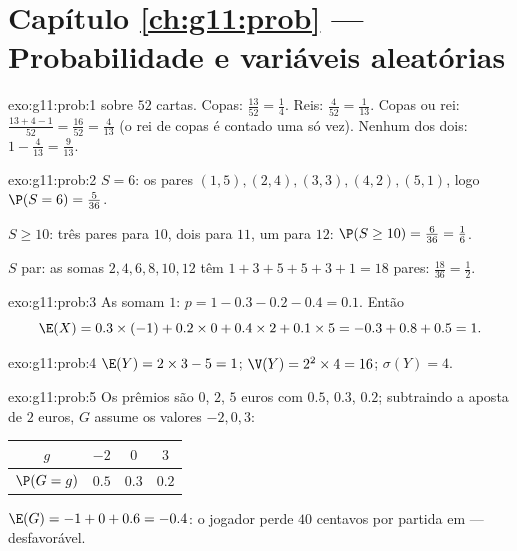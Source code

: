 \section*{Capítulo \ref{ch:g11:prob} --- Probabilidade e variáveis aleatórias}

\begin{solution}{exo:g11:prob:1}
 sobre $52$ cartas. Copas:
$\frac{13}{52} = \frac14$. Reis: $\frac{4}{52} = \frac{1}{13}$. Copas ou
rei: $\frac{13 + 4 - 1}{52} = \frac{16}{52} = \frac{4}{13}$ (o rei de
copas é contado uma só vez). Nenhum dos dois:
$1 - \frac{4}{13} = \frac{9}{13}$.
\end{solution}

\begin{solution}{exo:g11:prob:2}
$S = 6$: os pares $(1,5), (2,4), (3,3), (4,2), (5,1)$, logo
$\P(S = 6) = \frac{5}{36}$.

$S \geq 10$: três pares para $10$, dois para $11$, um para $12$:
$\P(S \geq 10) = \frac{6}{36} = \frac16$.

$S$ par: as somas $2, 4, 6, 8, 10, 12$ têm
$1 + 3 + 5 + 5 + 3 + 1 = 18$ pares: 
$\frac{18}{36} = \frac12$.
\end{solution}

\begin{solution}{exo:g11:prob:3}
As  somam $1$: $p = 1 - 0.3 - 0.2 - 0.4 = 0.1$. Então
\[
\E(X) = 0.3 \times (-1) + 0.2 \times 0 + 0.4 \times 2 + 0.1 \times 5
= -0.3 + 0.8 + 0.5 = 1 .
\]
\end{solution}

\begin{solution}{exo:g11:prob:4}
$\E(Y) = 2 \times 3 - 5 = 1$; $\V(Y) = 2^2 \times 4 = 16$;
$\sigma(Y) = 4$.
\end{solution}

\begin{solution}{exo:g11:prob:5}
Os prêmios são $0$, $2$, $5$ euros com  $0.5$, $0.3$,
$0.2$; subtraindo a aposta de $2$ euros, $G$ assume os valores
$-2, 0, 3$:
\begin{center}
\begin{tabular}{c|ccc}
$g$ & $-2$ & $0$ & $3$\\
\hline
$\P(G=g)$ & $0.5$ & $0.3$ & $0.2$
\end{tabular}
\end{center}
$\E(G) = -1 + 0 + 0.6 = -0.4$: o jogador perde $40$ centavos por partida
em  --- desfavorável.
\end{solution}

